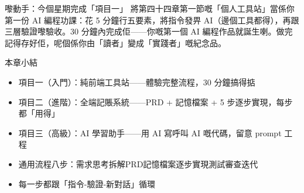 \begin{tcbpractice}{嚟動手：今個星期完成「項目一」}
將第四十四章第一節嘅「個人工具站」當係你第一份 AI 編程功課：花 5 分鐘行五要素，將指令發畀 AI（邊個工具都得），再跟三層驗證嚟驗收。30 分鐘內完成佢——你嘅第一個 AI 編程作品就誕生喇。做完記得存好佢，呢個係你由「讀者」變成「實踐者」嘅紀念品。

\end{tcbpractice}

\begin{tcbsummary}{本章小結}
\begin{itemize}
  \item 項目一（入門）：純前端工具站——體驗完整流程，30 分鐘搞得掂
  \item 項目二（進階）：全端記賬系統——PRD + 記憶檔案 + 5 步逐步實現，每步都「用得」
  \item 項目三（高級）：AI 學習助手——用 AI 寫呼叫 AI 嘅代碼，留意 prompt 工程
  \item 通用流程八步：需求思考拆解PRD記憶檔案逐步實現測試審查迭代
  \item 每一步都跟「指令-驗證-新對話」循環
\end{itemize}

\end{tcbsummary}
